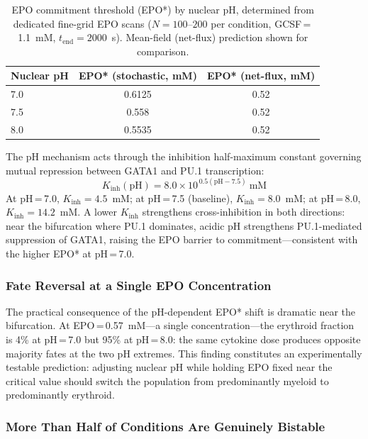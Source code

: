 \begin{table}[ht]
\caption{EPO commitment threshold (EPO*) by nuclear pH, determined from
dedicated fine-grid EPO scans ($N=100$--$200$ per condition, GCSF\,=\,1.1~mM,
$t_{\mathrm{end}}=2000$~s). Mean-field (net-flux) prediction shown for comparison.}
\label{tab:ph_threshold}
\centering
\small
\begin{tabularx}{\linewidth}{@{}Xcc@{}}
\toprule
\textbf{Nuclear pH} & \textbf{EPO* (stochastic, mM)} & \textbf{EPO* (net-flux, mM)} \\
\midrule
7.0 & 0.6125 & 0.52 \\
7.5 & 0.558  & 0.52 \\
8.0 & 0.5535 & 0.52 \\
\bottomrule
\end{tabularx}
\end{table}

The pH mechanism acts through the inhibition half-maximum constant governing
mutual repression between GATA1 and PU.1 transcription:
\begin{equation}
K_{\mathrm{inh}}(\mathrm{pH}) = 8.0 \times 10^{\,0.5(\mathrm{pH} - 7.5)}
\ \mathrm{mM}
\label{eq:pHhill}
\end{equation}
At pH\,=\,7.0, $K_{\mathrm{inh}} = 4.5$~mM; at pH\,=\,7.5 (baseline),
$K_{\mathrm{inh}} = 8.0$~mM; at pH\,=\,8.0, $K_{\mathrm{inh}} = 14.2$~mM.
A lower $K_{\mathrm{inh}}$ strengthens cross-inhibition in both directions:
near the bifurcation where PU.1 dominates, acidic pH strengthens PU.1-mediated
suppression of GATA1, raising the EPO barrier to commitment---consistent with
the higher EPO* at pH\,=\,7.0.

\subsubsection*{Fate Reversal at a Single EPO Concentration}

The practical consequence of the pH-dependent EPO* shift is dramatic near the
bifurcation. At EPO\,=\,0.57~mM---a single concentration---the erythroid
fraction is 4\% at pH\,=\,7.0 but 95\% at pH\,=\,8.0: the same cytokine dose
produces opposite majority fates at the two pH extremes. This finding constitutes
an experimentally testable prediction: adjusting nuclear pH while holding EPO
fixed near the critical value should switch the population from predominantly
myeloid to predominantly erythroid.

\subsubsection*{More Than Half of Conditions Are Genuinely Bistable}

